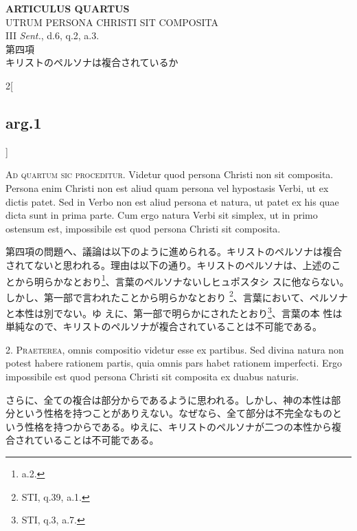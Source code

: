 \documentclass[paper=a4paper,fontsize=10pt,jafontsize=9pt,titlepage]{jlreq}
\begin{document}
{}
\setcounter{section}{4}
\setcounter{subsection}{0}
\begin{center}
{\Large {\bfseries ARTICULUS QUARTUS}}\\ {\large UTRUM PERSONA CHRISTI SIT
COMPOSITA}\\ {\footnotesize III {\itshape Sent.}, d.6, q.2, a.3.}\\
{\Large 第四項\\キリストのペルソナは複合されているか}
\end{center}

\begin{paracol}{2}[\subsection{arg.1}]

{\Huge A}{\scshape d quartum sic proceditur}. Videtur quod persona
Christi non sit composita. Persona enim Christi non est aliud quam
persona vel hypostasis Verbi, ut ex dictis patet. Sed in Verbo non est
aliud persona et natura, ut patet ex his quae dicta sunt in prima
parte. Cum ergo natura Verbi sit simplex, ut in primo ostensum est,
impossibile est quod persona Christi sit composita.

\switchcolumn

第四項の問題へ、議論は以下のように進められる。キリストのペルソナは複合
されてないと思われる。理由は以下の通り。キリストのペルソナは、上述のこ
とから明らかなとおり\footnote{a.2.}、言葉のペルソナないしヒュポスタシ
スに他ならない。しかし、第一部で言われたことから明らかなとおり
\footnote{STI, q.39, a.1.}、言葉において、ペルソナと本性は別でない。ゆ
えに、第一部で明らかにされたとおり\footnote{STI, q.3, a.7.}、言葉の本
性は単純なので、キリストのペルソナが複合されていることは不可能である。


2. {\scshape Praeterea}, omnis compositio videtur esse ex
partibus. Sed divina natura non potest habere rationem partis, quia
omnis pars habet rationem imperfecti. Ergo impossibile est quod
persona Christi sit composita ex duabus naturis.

\switchcolumn

さらに、全ての複合は部分からであるように思われる。しかし、神の本性は部
分という性格を持つことがありえない。なぜなら、全て部分は不完全なものと
いう性格を持つからである。ゆえに、キリストのペルソナが二つの本性から複
合されていることは不可能である。


\end{paracol}
\end{document}
